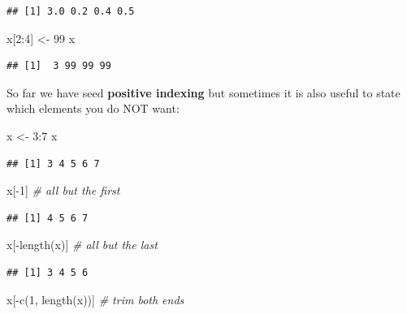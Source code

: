 \documentclass[
]{book}
\newenvironment{Shaded}{\begin{snugshade}}{\end{snugshade}}
\newcommand{\CommentTok}[1]{\textcolor[rgb]{0.56,0.35,0.01}{\textit{#1}}}
\newcommand{\DecValTok}[1]{\textcolor[rgb]{0.00,0.00,0.81}{#1}}
\newcommand{\FunctionTok}[1]{\textcolor[rgb]{0.00,0.00,0.00}{#1}}
\newcommand{\NormalTok}[1]{#1}
\newcommand{\OtherTok}[1]{\textcolor[rgb]{0.56,0.35,0.01}{#1}}
\newcommand{\SpecialCharTok}[1]{\textcolor[rgb]{0.00,0.00,0.00}{#1}}
\begin{document}
\begin{verbatim}
## [1] 3.0 0.2 0.4 0.5
\end{verbatim}

\begin{Shaded}
\begin{Highlighting}[]
\NormalTok{x[}\DecValTok{2}\SpecialCharTok{:}\DecValTok{4}\NormalTok{] }\OtherTok{\textless{}{-}} \DecValTok{99}
\NormalTok{x}
\end{Highlighting}
\end{Shaded}

\begin{verbatim}
## [1]  3 99 99 99
\end{verbatim}

So far we have seed \textbf{positive indexing} but sometimes it is also useful to state which elements you do NOT want:

\begin{Shaded}
\begin{Highlighting}[]
\NormalTok{x }\OtherTok{\textless{}{-}} \DecValTok{3}\SpecialCharTok{:}\DecValTok{7}
\NormalTok{x}
\end{Highlighting}
\end{Shaded}

\begin{verbatim}
## [1] 3 4 5 6 7
\end{verbatim}

\begin{Shaded}
\begin{Highlighting}[]
\NormalTok{x[}\SpecialCharTok{{-}}\DecValTok{1}\NormalTok{] }\CommentTok{\# all but the first}
\end{Highlighting}
\end{Shaded}

\begin{verbatim}
## [1] 4 5 6 7
\end{verbatim}

\begin{Shaded}
\begin{Highlighting}[]
\NormalTok{x[}\SpecialCharTok{{-}}\FunctionTok{length}\NormalTok{(x)] }\CommentTok{\# all but the last}
\end{Highlighting}
\end{Shaded}

\begin{verbatim}
## [1] 3 4 5 6
\end{verbatim}

\begin{Shaded}
\begin{Highlighting}[]
\NormalTok{x[}\SpecialCharTok{{-}}\FunctionTok{c}\NormalTok{(}\DecValTok{1}\NormalTok{, }\FunctionTok{length}\NormalTok{(x))] }\CommentTok{\# trim both ends}
\end{Highlighting}
\end{Shaded}
\end{document}
